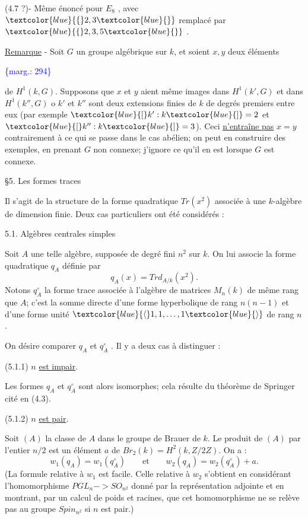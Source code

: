 \documentclass[11pt]{article}
\newcommand{\scanpage}[1]{\par\bigskip\noindent{\small\sffamily[scan #1]}\par}
\newcommand{\mspage}[1]{{\small\sffamily[p.\,#1]}}
\newcommand{\hand}[1]{\textcolor{blue}{#1}}
\let\over\relax
\newcommand{\over}[2]{\textcolor{gray}{#1}\textcolor{blue}{\ensuremath{^{\!\nearrow}}#2}}
\newcommand{\margin}[1]{\textcolor{blue}{\{\textsf{marg.:} #1\}}}
\newcommand{\uline}[1]{\underline{#1}}
\begin{document}
(4.7 ?)- Même énoncé pour $E_8$ , avec $\hand{\{}2,3\hand{\}}$ remplacé par $\hand{\{}2,3,5\hand{\}}$ .

\uline{Remarque} - Soit $G$ un groupe algébrique sur $k$, et soient $x,y$ deux éléments

\margin{294}

\clearpage
\scanpage{119/295}
\mspage{- 8 -}

de $H^1(k, G)$. Supposons que $x$ et $y$ aient même images dans $H^1(k', G)$
et dans $H^1(k'', G)$ o\over{u}{ù} $k'$ et $k''$ sont deux extensions finies de $k$ de
degrés premiers entre eux (par exemple $\hand{[}k':k\hand{]} = 2$ et $\hand{[}k'':k\hand{]} = 3$). Ceci
\uline{n'entraîne pas} $x = y$ contrairement à ce qui se passe dans le cas abélien;
on peut en construire des exemples, en prenant $G$ non connexe; j'ignore
ce qu'il en est lorsque $G$ est connexe.

§5. Les formes traces

Il s'agit de la structure de la forme quadratique $Tr(x^2)$ associée à
une $k$-algèbre de dimension finie. Deux cas particuliers ont été considérés :

5.1. Algèbres centrales simples

Soit $A$ une telle algèbre, supposée de degré fini $n^2$ sur $k$. On lui
associe la forme quadratique $q_A$ définie par
\[ q_A(x) = Trd_{A/k}(x^2). \]
Notons $q^\circ_A$ la forme trace associée à l'algèbre de matrices $M_n(k)$ de
même rang que $A$; c'est la somme directe d'une forme hyperbolique de rang
$n(n-1)$ et d'une forme unité $\hand{\langle}1,1,\ldots,1\hand{\rangle}$ de rang $n$.

On désire comparer $q_A$ et $q^\circ_A$ . Il y a deux cas à distinguer :

(5.1.1) $n$ \uline{est impair}.

Les formes $q_A$ et $q^\circ_A$ sont alors isomorphes; cela résulte du théorème de
Springer cité en (4.3).

(5.1.2) $n$ \uline{est pair}.

Soit $(A)$ la classe de $A$ dans le groupe de Brauer de $k$. Le produit
de $(A)$ par l'entier $n/2$ est un élément $a$ de $Br_2(k) = H^2(k, Z/2Z)$. On a :
\[ w_1(q_A) = w_1(q^\circ_A) \qquad \text{et} \qquad w_2(q_A) = w_2(q^\circ_A) + a . \]
(La formule relative à $w_1$ est facile. Celle relative à $w_2$ s'obtient en
considérant l'homomorphisme $PGL_n \mathrel{-\!\!>} SO_{n^2}$ donné par la représentation
adjointe et en montrant, par un calcul de poids et racines, que cet
homomorphisme ne se relève pas au groupe $Spin_{n^2}$ si $n$ est pair.)
\end{document}
